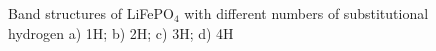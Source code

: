 \begin{figure}[h]
\begin{minipage}[h]{0.48\linewidth}
\end{minipage}
\hfill
\begin{minipage}[h]{0.48\linewidth}
\end{minipage}
\caption{Band structures of LiFePO$_4$ with different numbers of substitutional hydrogen a) 1H; b) 2H; c) 3H; d) 4H}
\label{LFP_xH_bs}
\end{figure}
